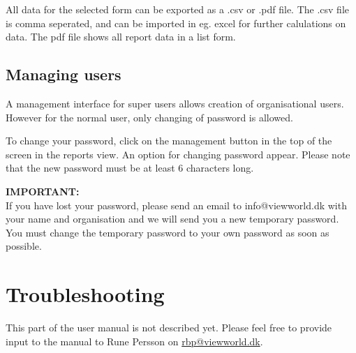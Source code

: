 \documentclass[a4paper, 12pt, final]{article}
\begin{document}
All data for the selected form can be exported as a .csv or .pdf file. The .csv file is comma seperated, and can be imported in eg. excel for further calulations on data. The pdf file shows all report data in a list form.

\subsection{Managing users}

A management interface for super users allows creation of organisational users. However for the normal user, only changing of password is allowed.

To change your password, click on the management button in the top of the screen in the reports view. An option for changing password appear. Please note that the new password must be at least 6 characters long.

\vspace{0.5cm}
\begin{boxedminipage}{\textwidth}
\textbf{IMPORTANT:}\\If you have lost your password, please send an email to info@viewworld.dk with your name and organisation and we will send you a new temporary password. You must change the temporary password to your own password as soon as possible.\end{boxedminipage}


\section{Troubleshooting}

This part of the user manual is not described yet. Please feel free to provide input to the manual to Rune Persson on \url{rbp@viewworld.dk}.
\end{document}
